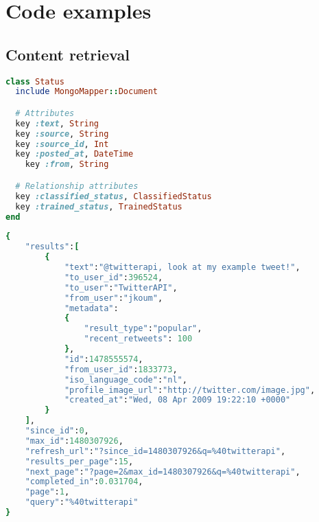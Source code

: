 \chapter{Code examples}

\section{Content retrieval}

\begin{lstlisting}[language=Ruby, caption={Illustration of Status class' MongoMapper attributes}, label=retrieval:status_code]
class Status
  include MongoMapper::Document

  # Attributes
  key :text, String         
  key :source, String
  key :source_id, Int
  key :posted_at, DateTime
	key :from, String

  # Relationship attributes
  key :classified_status, ClassifiedStatus
  key :trained_status, TrainedStatus 
end
\end{lstlisting}

\begin{lstlisting}[language=Ruby, caption={Example Twitter search API results}, label=retrieval:example_search]
{
	"results":[
		{
			"text":"@twitterapi, look at my example tweet!",
			"to_user_id":396524,
			"to_user":"TwitterAPI",
			"from_user":"jkoum",
			"metadata":
			{
				"result_type":"popular",
				"recent_retweets": 100
			},
			"id":1478555574,
			"from_user_id":1833773,
			"iso_language_code":"nl",
			"profile_image_url":"http://twitter.com/image.jpg",
			"created_at":"Wed, 08 Apr 2009 19:22:10 +0000"
		}
	],
	"since_id":0,
	"max_id":1480307926,
	"refresh_url":"?since_id=1480307926&q=%40twitterapi",
	"results_per_page":15,
	"next_page":"?page=2&max_id=1480307926&q=%40twitterapi",
	"completed_in":0.031704,
	"page":1,
	"query":"%40twitterapi"
}
\end{lstlisting}

% 